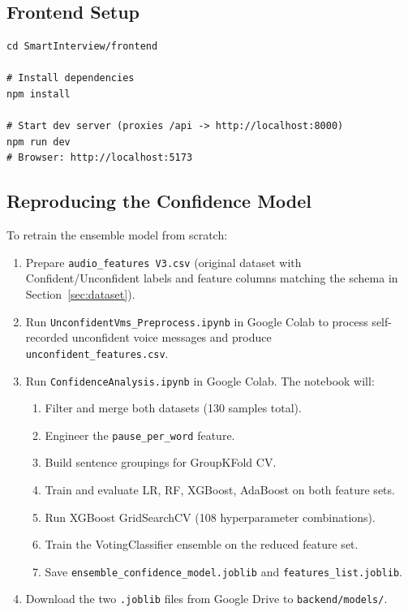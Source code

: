 \documentclass[12pt,a4paper]{article}
\begin{document}
\subsection{Frontend Setup}

\begin{lstlisting}[style=bash, numbers=none]
cd SmartInterview/frontend

# Install dependencies
npm install

# Start dev server (proxies /api -> http://localhost:8000)
npm run dev
# Browser: http://localhost:5173
\end{lstlisting}

\subsection{Reproducing the Confidence Model}

To retrain the ensemble model from scratch:

\begin{enumerate}[leftmargin=2em]
  \item Prepare \texttt{audio\_features V3.csv} (original dataset with Confident/Unconfident labels and feature columns matching the schema in Section~\ref{sec:dataset}).
  \item Run \texttt{UnconfidentVms\_Preprocess.ipynb} in Google Colab to process self-recorded unconfident voice messages and produce \texttt{unconfident\_features.csv}.
  \item Run \texttt{ConfidenceAnalysis.ipynb} in Google Colab. The notebook will:
  \begin{enumerate}
    \item Filter and merge both datasets (130 samples total).
    \item Engineer the \texttt{pause\_per\_word} feature.
    \item Build sentence groupings for GroupKFold CV.
    \item Train and evaluate LR, RF, XGBoost, AdaBoost on both feature sets.
    \item Run XGBoost GridSearchCV (108 hyperparameter combinations).
    \item Train the VotingClassifier ensemble on the reduced feature set.
    \item Save \texttt{ensemble\_confidence\_model.joblib} and \texttt{features\_list.joblib}.
  \end{enumerate}
  \item Download the two \texttt{.joblib} files from Google Drive to \texttt{backend/models/}.
\end{enumerate}
\end{document}
